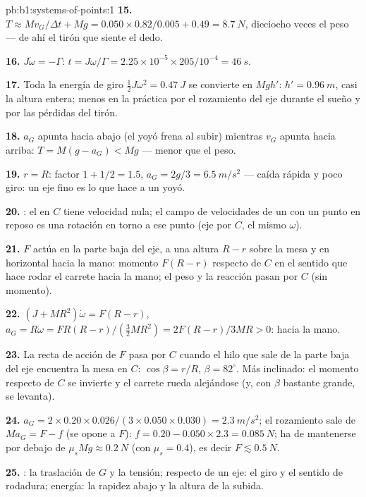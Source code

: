 \begin{solution}{pb:b1:systems-of-points:1}
\textbf{15.} $T \approx Mv_G/\Delta t + Mg = 0.050 \times 0.82/0.005 + 0.49 =
\qty{8.7}{N}$, dieciocho veces el peso --- de ahí el tirón que siente el
dedo.

\textbf{16.} $J\dot\omega = -\Gamma$: $t = J\omega/\Gamma = 2.25\times10^{-5} \times
205/10^{-4} = \qty{46}{s}$.

\textbf{17.} Toda la energía de giro $\tfrac12 J\omega^2 = \qty{0.47}{J}$ se
convierte en $Mgh'$: $h' = \qty{0.96}{m}$, casi la altura entera; menos en
la práctica por el rozamiento del eje durante el sueño y por las pérdidas
del tirón.

\textbf{18.} $a_G$ apunta hacia abajo (el yoyó frena al subir) mientras
$v_G$ apunta hacia arriba: $T = M(g - a_G) < Mg$ --- menor que el peso.

\textbf{19.} $r = R$: factor $1 + 1/2 = 1.5$, $a_G = 2g/3 = \qty{6.5}{m/s^2}$
--- caída rápida y poco giro: un eje fino es lo que hace a un yoyó.

\textbf{20.} : el  en $C$ tiene
velocidad nula; el campo de velocidades de un  con un punto
en reposo es una rotación en torno a ese punto (eje por $C$, el mismo $\omega$).

\textbf{21.} $F$ actúa en la parte baja del eje, a una altura $R - r$ sobre
la mesa y en horizontal hacia la mano: momento $F(R - r)$ respecto de $C$
en el sentido que hace rodar el carrete hacia la mano; el peso y la
reacción pasan por $C$ (sin momento).

\textbf{22.} $(J + MR^2)\dot\omega = F(R - r)$, $a_G = R\dot\omega = FR(R - r)/
(\tfrac32 MR^2) = 2F(R - r)/3MR > 0$: hacia la mano.

\textbf{23.} La recta de acción de $F$ pasa por $C$ cuando el hilo que sale
de la parte baja del eje encuentra la mesa en $C$: $\cos\beta = r/R$,
$\beta = 82^\circ$. Más inclinado: el momento respecto de $C$ se invierte y
el carrete rueda alejándose (y, con $\beta$ bastante grande, se levanta).

\textbf{24.} $a_G = 2 \times 0.20 \times 0.026/(3 \times 0.050 \times 0.030) =
\qty{2.3}{m/s^2}$; el rozamiento sale de $Ma_G = F - f$ (se opone a $F$):
$f = 0.20 - 0.050 \times 2.3 = \qty{0.085}{N}$; ha de mantenerse por debajo
de $\mu_sMg
\approx \qty{0.2}{N}$ (con $\mu_s = 0.4$), es decir $F \lesssim \qty{0.5}{N}$.

\textbf{25.} : la traslación de $G$ y la tensión;  respecto de un eje: el giro y el sentido de rodadura; energía: la
rapidez abajo y la altura de la subida.
\end{solution}
